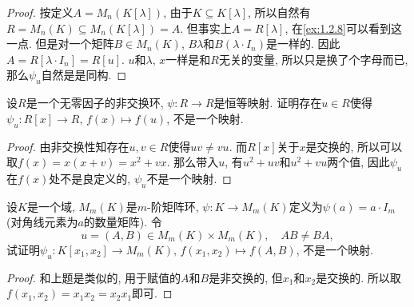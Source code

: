 \begin{proof}
    按定义$A = M_n(K[\lambda])$, 由于$K \subseteq K[\lambda]$, 所以自然有$R = M_n(K) \subseteq M_n(K[\lambda]) = A$. 但事实上$A = R[\lambda]$, 在\ref{ex:1.2.8}可以看到这一点. 但是对一个矩阵$B \in M_n(K)$, $B\lambda$和$B(\lambda \cdot I_n)$是一样的. 因此$A = R[\lambda \cdot I_n] = R[u]$. $u$和$\lambda$, $x$一样是和$R$无关的变量, 所以只是换了个字母而已, 那么$\psi_u$自然是是同构.
\end{proof}

\begin{problem}\label{ex:2.4.7}
    设$R$是一个无零因子的非交换环, $\psi:R \to R$是恒等映射. 证明存在$u \in R$使得$\psi_u:R[x] \to R$, $f(x) \mapsto f(u)$, 不是一个映射.
\end{problem}
    
\begin{proof}
    由非交换性知存在$u, v \in R$使得$uv \neq vu$. 而$R[x]$关于$x$是交换的, 所以可以取$f(x) = x(x + v) = x^2 + vx$. 那么带入$u$, 有$u^2 + uv$和$u^2 + vu$两个值, 因此$\psi_u$在$f(x)$处不是良定义的, $\psi_u$不是一个映射.
\end{proof}

\begin{problem}\label{ex:2.4.8}
    设$K$是一个域, $M_m(K)$是$m$-阶矩阵环, $\psi:K \to M_m(K)$定义为$\psi(a) = a \cdot I_{m}$(对角线元素为$a$的数量矩阵). 令
\[
    u = (A, B) \in M_m(K) \times M_m(K),\quad AB \neq BA,
\]
试证明$\psi_u:K[x_1, x_2] \to M_m(K),\, f(x_1, x_2) \mapsto f(A, B)$, 不是一个映射.
\end{problem}

\begin{proof}
    和上题是类似的, 用于赋值的$A$和$B$是非交换的, 但$x_1$和$x_2$是交换的. 所以取$f(x_1, x_2) = x_1x_2 = x_2x_1$即可.
\end{proof}

